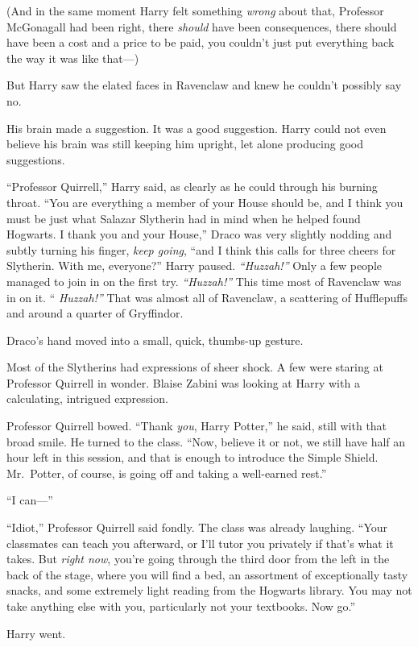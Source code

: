 (And in the same moment Harry felt something \emph{wrong} about that,
Professor McGonagall had been right, there \emph{should} have been
consequences, there should have been a cost and a price to be paid, you
couldn't just put everything back the way it was like that---)

But Harry saw the elated faces in Ravenclaw and knew he couldn't
possibly say no.

His brain made a suggestion. It was a good suggestion. Harry could not
even believe his brain was still keeping him upright, let alone
producing good suggestions.

``Professor Quirrell,'' Harry said, as clearly as he could through his
burning throat. ``You are everything a member of your House should be,
and I think you must be just what Salazar Slytherin had in mind when he
helped found Hogwarts. I thank you and your House,'' Draco was very
slightly nodding and subtly turning his finger, \emph{keep going}, ``and
I think this calls for three cheers for Slytherin. With me, everyone?''
Harry paused. \emph{``Huzzah!''} Only a few people managed to join in on
the first try. \emph{``Huzzah!''} This time most of Ravenclaw was in on
it. `` \emph{Huzzah!''} That was almost all of Ravenclaw, a scattering
of Hufflepuffs and around a quarter of Gryffindor.

Draco's hand moved into a small, quick, thumbs-up gesture.

Most of the Slytherins had expressions of sheer shock. A few were
staring at Professor Quirrell in wonder. Blaise Zabini was looking at
Harry with a calculating, intrigued expression.

Professor Quirrell bowed. ``Thank \emph{you}, Harry Potter,'' he said,
still with that broad smile. He turned to the class. ``Now, believe it
or not, we still have half an hour left in this session, and that is
enough to introduce the Simple Shield. Mr.~Potter, of course, is going
off and taking a well-earned rest.''

``I can---''

``Idiot,'' Professor Quirrell said fondly. The class was already
laughing. ``Your classmates can teach you afterward, or I'll tutor you
privately if that's what it takes. But \emph{right now}, you're going
through the third door from the left in the back of the stage, where you
will find a bed, an assortment of exceptionally tasty snacks, and some
extremely light reading from the Hogwarts library. You may not take
anything else with you, particularly not your textbooks. Now go.''

Harry went.
